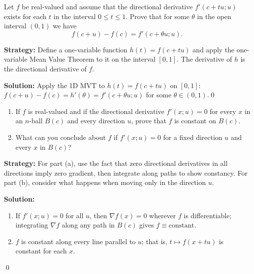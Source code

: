 \begin{problembox}
\begin{problemstatement}
Let \( f \) be real-valued and assume that the directional derivative \( f'(c + tu; u) \) exists for each \( t \) in the interval \( 0 \leq t \leq 1 \). Prove that for some \( \theta \) in the open interval \( (0, 1) \) we have
\[f(c + u) - f(c) = f'(c + \theta u; u).\]
\end{problemstatement}
\end{problembox}

\noindent\textbf{Strategy:} Define a one-variable function \( h(t) = f(c + tu) \) and apply the one-variable Mean Value Theorem to it on the interval \( [0,1] \). The derivative of \( h \) is the directional derivative of \( f \).

\bigskip\noindent\textbf{Solution:}
Apply the 1D MVT to $h(t)=f(c+tu)$ on $[0,1]$: $f(c+u)-f(c)=h'(\theta)=f'(c+\theta u;u)$ for some $\theta\in(0,1)$.\qed


\begin{problembox}
\begin{problemstatement}
\begin{enumerate}[label=(\alph*)]
\item If \( f \) is real-valued and if the directional derivative \( f'(x; u) = 0 \) for every \( x \) in an \( n \)-ball \( B(c) \) and every direction \( u \), prove that \( f \) is constant on \( B(c) \).
\item What can you conclude about \( f \) if \( f'(x; u) = 0 \) for a fixed direction \( u \) and every \( x \) in \( B(c) \)?
\end{enumerate}
\end{problemstatement}
\end{problembox}

\noindent\textbf{Strategy:} For part (a), use the fact that zero directional derivatives in all directions imply zero gradient, then integrate along paths to show constancy. For part (b), consider what happens when moving only in the direction \( u \).

\bigskip\noindent\textbf{Solution:}
\begin{enumerate}[label=(\alph*)]
\item If $f'(x;u)=0$ for all $u$, then $\nabla f(x)=0$ wherever $f$ is differentiable; integrating $\nabla f$ along any path in $B(c)$ gives $f\equiv\text{constant}$.
\item $f$ is constant along every line parallel to $u$; that is, $t\mapsto f(x+tu)$ is constant for each $x$.
\end{enumerate}\qed

